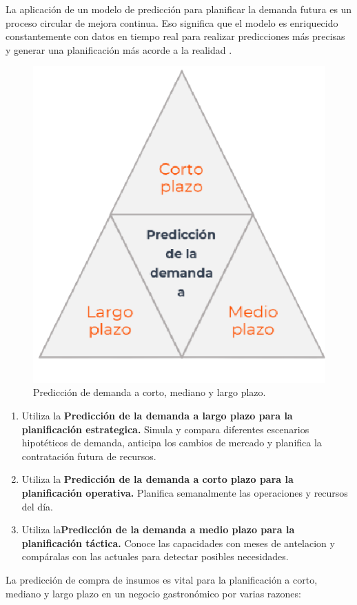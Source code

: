 \vspace{1\baselineskip}
La aplicación de un modelo de predicción para planificar la demanda futura es un proceso circular de mejora continua. Eso significa que el modelo es enriquecido constantemente con datos en tiempo real para realizar predicciones más precisas y generar una planificación más acorde a la realidad \cite{decide}.
\begin{figure}[H]
  \begin{center}
    \includegraphics[scale=0.50]{./trianguloCMD.png}
    \caption{Predicción de demanda a corto, mediano y largo plazo.}
    \label{fig:proceso_inventario}
  \end{center}
\end{figure}

\begin{enumerate}
  \item Utiliza la \textbf{Predicción de la demanda a largo plazo para la planificación
          estrategica.} Simula y compara diferentes escenarios hipotéticos de demanda,
        anticipa los cambios de mercado y planifica la contratación futura de recursos.
  \item Utiliza la \textbf{Predicción de la demanda a corto plazo para la planificación
          operativa.} Planifica semanalmente las operaciones y recursos del día.
  \item Utiliza la\textbf{Predicción de la demanda a medio plazo para la planificación
          táctica.} Conoce las capacidades con meses de antelacion y compáralas con las
        actuales para detectar posibles necesidades.
\end{enumerate}
\vspace{1\baselineskip}
La predicción de compra de insumos es vital para la planificación a corto, mediano y largo plazo en un negocio gastronómico por varias razones:

